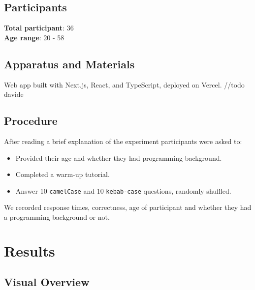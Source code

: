 \documentclass[unicode,11pt,a4paper,oneside,numbers=endperiod,openany]{scrartcl}
\begin{document}
\subsection{Participants}
\textbf{Total participant}: 36 \\
\textbf{Age range}: 20 - 58 \\

\subsection{Apparatus and Materials}
Web app built with Next.js, React, and TypeScript, deployed on Vercel. //todo davide

\subsection{Procedure}
After reading a brief explanation of the experiment participants were asked to:
\begin{itemize}
    \item Provided their age and whether they had programming background.
    \item Completed a warm-up tutorial.
    \item Answer 10 \texttt{camelCase} and 10 \texttt{kebab-case} questions, randomly shuffled.
\end{itemize}

We recorded response times, correctness, age of participant and whether they had a programming background or not.

\section{Results}

\subsection{Visual Overview}
\end{document}
